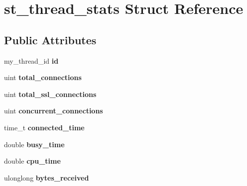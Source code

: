 \hypertarget{structst__thread__stats}{}\section{st\+\_\+thread\+\_\+stats Struct Reference}
\label{structst__thread__stats}
\subsection*{Public Attributes}
\begin{DoxyCompactItemize}
\item 
\mbox{\label{structst__thread__stats_ae1151ec351af80f546abf89efe0ee63c}} 
my\+\_\+thread\+\_\+id {\bfseries id}
\item 
\mbox{\label{structst__thread__stats_a70afaa80710ca26b5c907f77503ff94d}} 
uint {\bfseries total\+\_\+connections}
\item 
\mbox{\label{structst__thread__stats_a2aa99896d3120740a3e8ca5a1ec0837b}} 
uint {\bfseries total\+\_\+ssl\+\_\+connections}
\item 
\mbox{\label{structst__thread__stats_a587fa968b782297801a3a757ea41162b}} 
uint {\bfseries concurrent\+\_\+connections}
\item 
\mbox{\label{structst__thread__stats_a37b2c77bd80719e40d76db96187b462a}} 
time\+\_\+t {\bfseries connected\+\_\+time}
\item 
\mbox{\label{structst__thread__stats_a27e1dbbe04c5a8d66a7a06f6f2a8584a}} 
double {\bfseries busy\+\_\+time}
\item 
\mbox{\label{structst__thread__stats_ae7c6f7e8b2b589c9f2be70e7a4449db8}} 
double {\bfseries cpu\+\_\+time}
\item 
\mbox{\label{structst__thread__stats_a9a59f0b3469f16fc1e575311e39030de}} 
ulonglong {\bfseries bytes\+\_\+received}
\item 
\mbox{\label{structst__thread__stats_abc49efb4e7bac1f0297d0ad17849c281}} 

\end{DoxyCompactItemize}
